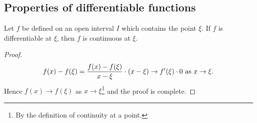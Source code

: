 \documentclass[10pt, a4paper]{article}
\begin{document}
\subsection{Properties of differentiable functions}
\begin{theorem}
    Let $f$ be defined on an open interval $I$ which contains the point $\xi$. If $f$ is differentiable at $\xi$, then $f$ is continuous at $\xi$.

    \begin{proof}
        \[
        f(x) - f(\xi) = \dfrac{f(x) - f(\xi)}{x - \xi} \cdot (x - \xi) \rightarrow f'(\xi) \cdot 0 \textnormal{ as } x \rightarrow \xi.
        \]
        Hence $f(x) \rightarrow f(\xi)$ as $x \rightarrow \xi$\footnote{By the definition of continuity at a point.} and the proof is complete.
    \end{proof}
\end{theorem}
\end{document}
